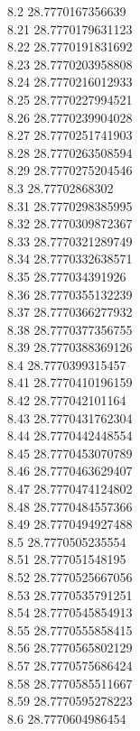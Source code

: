 {8.2	28.7770167356639\\
8.21	28.7770179631123\\
8.22	28.7770191831692\\
8.23	28.7770203958808\\
8.24	28.7770216012933\\
8.25	28.7770227994521\\
8.26	28.7770239904028\\
8.27	28.7770251741903\\
8.28	28.7770263508594\\
8.29	28.7770275204546\\
8.3	28.77702868302\\
8.31	28.7770298385995\\
8.32	28.7770309872367\\
8.33	28.7770321289749\\
8.34	28.7770332638571\\
8.35	28.777034391926\\
8.36	28.7770355132239\\
8.37	28.7770366277932\\
8.38	28.7770377356755\\
8.39	28.7770388369126\\
8.4	28.7770399315457\\
8.41	28.7770410196159\\
8.42	28.777042101164\\
8.43	28.7770431762304\\
8.44	28.7770442448554\\
8.45	28.7770453070789\\
8.46	28.7770463629407\\
8.47	28.7770474124802\\
8.48	28.7770484557366\\
8.49	28.7770494927488\\
8.5	28.7770505235554\\
8.51	28.777051548195\\
8.52	28.7770525667056\\
8.53	28.7770535791251\\
8.54	28.7770545854913\\
8.55	28.7770555858415\\
8.56	28.7770565802129\\
8.57	28.7770575686424\\
8.58	28.7770585511667\\
8.59	28.7770595278223\\
8.6	28.7770604986454\\
}
